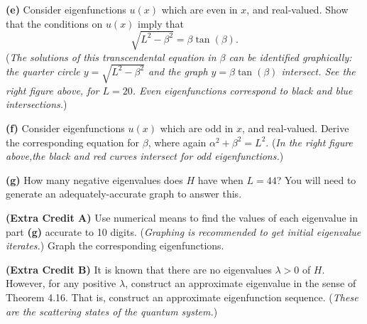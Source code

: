 \documentclass[12pt]{amsart}
\newcommand{\epart}[1]{\medskip\noindent\textbf{(#1)}\quad }
\begin{document}
\epart{e}  Consider eigenfunctions $u(x)$ which are even in $x$, and real-valued.  Show that the conditions on $u(x)$ imply that
	$$\sqrt{L^2-\beta^2} = \beta \tan(\beta).$$
(\emph{The solutions of this transcendental equation in $\beta$ can be identified graphically: the quarter circle $y=\sqrt{L^2-\beta^2}$ and the graph $y=\beta \tan(\beta)$ intersect.  See the right figure above, for $L=20$.  Even eigenfunctions correspond to black and blue intersections.})

\epart{f}  Consider eigenfunctions $u(x)$ which are odd in $x$, and real-valued.  Derive the corresponding equation for $\beta$, where again $\alpha^2+\beta^2=L^2$.  (\emph{In the right figure above,the black and red curves intersect for odd eigenfunctions.})

\epart{g}  How many negative eigenvalues does $H$ have when $L=44$?  You will need to generate an adequately-accurate graph to answer this.

\medskip
\epart{Extra Credit A}  Use numerical means to find the values of each eigenvalue in part \textbf{(g)} accurate to 10 digits.  (\emph{Graphing is recommended to get initial eigenvalue iterates.})  Graph the corresponding eigenfunctions.

\epart{Extra Credit B}  It is known that there are no eigenvalues $\lambda>0$ of $H$.  However, for any positive $\lambda$, construct an approximate eigenvalue in the sense of Theorem 4.16.  That is, construct an approximate eigenfunction sequence.  (\emph{These are the \emph{scattering states} of the quantum system.})
\end{document}
